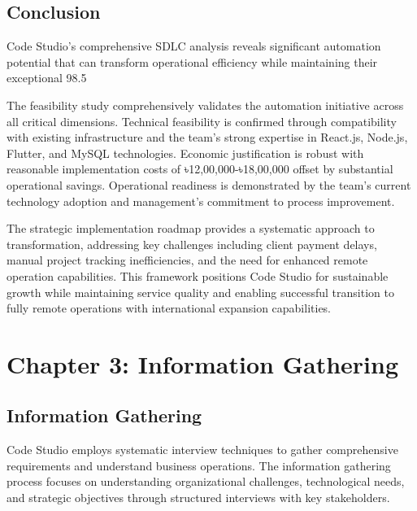 \documentclass[12pt,a4paper]{article}
\begin{document}
\subsection{Conclusion}

Code Studio's comprehensive SDLC analysis reveals significant automation potential that can transform operational efficiency while maintaining their exceptional 98.5%

The feasibility study comprehensively validates the automation initiative across all critical dimensions. Technical feasibility is confirmed through compatibility with existing infrastructure and the team's strong expertise in React.js, Node.js, Flutter, and MySQL technologies. Economic justification is robust with reasonable implementation costs of ৳12,00,000-৳18,00,000 offset by substantial operational savings. Operational readiness is demonstrated by the team's current technology adoption and management's commitment to process improvement.

The strategic implementation roadmap provides a systematic approach to transformation, addressing key challenges including client payment delays, manual project tracking inefficiencies, and the need for enhanced remote operation capabilities. This framework positions Code Studio for sustainable growth while maintaining service quality and enabling successful transition to fully remote operations with international expansion capabilities.

\newpage
\pagestyle{chapter3style}

\section{Chapter 3: Information Gathering}

\subsection{Information Gathering}

Code Studio employs systematic interview techniques to gather comprehensive requirements and understand business operations. The information gathering process focuses on understanding organizational challenges, technological needs, and strategic objectives through structured interviews with key stakeholders.
\end{document}
